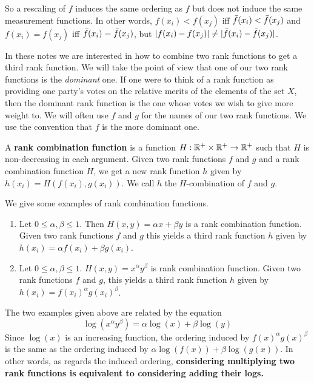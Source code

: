 \documentclass{article}
\begin{document}
So a rescaling of $f$ induces the same ordering as $f$ but does not induce the
same measurement functions.  In other
words, $f(x_i)<f(x_j)$ iff $\bar{f}(x_i)<\bar{f}(x_j)$ and $f(x_i)=f(x_j)$ iff
$\bar{f}(x_i)=\bar{f}(x_j)$, 
but $|f(x_i)-f(x_j)| \neq |\bar{f}(x_i)-\bar{f}(x_j)|$.

In these notes we are interested in how to combine two rank functions to get a third
rank function. 
We will take the point of view that one of our two rank functions is the \emph{dominant} one. 
If one were to think of a rank function as providing one party's votes on the relative merits of the elements of the set 
$X$, then the dominant rank function is the one whose votes we wish to give more weight to. We will often use $f$ and $g$ 
for the names of our two rank functions. We use the convention that $f$ is the more dominant one.

\begin{definition}
A \textbf{rank combination function} is a function $H:\mathbb{R}^{+}\times\mathbb{R}^{+}\rightarrow\mathbb{R}^{+}$ such that $H$ is non-decreasing in each argument. 
Given two rank functions $f$ and $g$ and a rank combination function $H$, we
get a new rank function $h$ given by $h(x_i) = H(f(x_i),g(x_i))$. 
We call $h$ the $H$-combination of $f$ and $g$.
\end{definition}

\begin{example}
We give some examples of rank combination functions.
\begin{enumerate}
\item Let $0\leq\alpha,\beta\leq 1$. Then $H(x,y) = \alpha x + \beta y$ is a
rank
combination function. Given two rank functions $f$ and $g$ this yields a third
rank function $h$ given by $h(x_i) = \alpha f(x_i) + \beta g(x_i)$.
\item Let $0\leq\alpha,\beta\leq 1$. $H(x,y) = x^{\alpha}y^{\beta}$ is rank combination function.
Given two rank functions $f$ and $g$, this yields a third rank function $h$ given by $h(x_i) = f(x_i)^{\alpha}g(x_i)^{\beta}$.
\end{enumerate}
\end{example}

\begin{remark}
The two examples given above are related by the equation
\begin{equation}
\log(x^{\alpha}y^{\beta}) = \alpha \log(x) + \beta \log(y)
\end{equation}
Since $\log(x)$ is an increasing function, the ordering induced by 
$f(x)^{\alpha}g(x)^{\beta}$ is the same as the ordering induced by
$\alpha \log(f(x)) + \beta \log(g(x))$. In other words, as regards the induced
ordering, \textbf{considering multiplying two rank functions is equivalent to
considering adding their logs.}
\end{remark}
\end{document}
